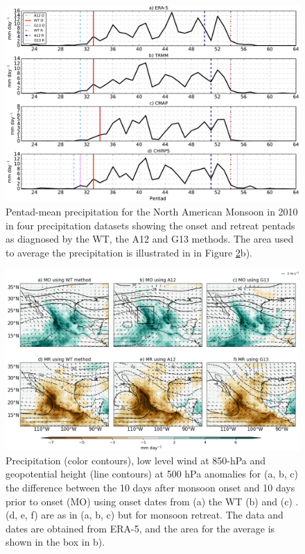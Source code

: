 \begin{figure}[t!]
\centering
 \includegraphics[width=\linewidth]{figures/wav_fig5.pdf}
\caption[Comparison of methods in 2010 in the North American Monsoon]{  Pentad-mean precipitation for the North American Monsoon in 2010 in four precipitation datasets showing the onset and retreat pentads as diagnosed by the WT, the A12 and G13 methods. The area used to average the precipitation is illustrated in in Figure \ref{fig:wav_fig6}b).} 
\label{fig:wav_compari}
\end{figure}


\begin{figure}[t!]
\centering
 \includegraphics[width=\linewidth]{figures/wav_fig6.png}
\caption[Precipitation anomalies during North American monsoon onset]{  Precipitation (color contours), low level wind at 850-hPa and geopotential height (line contours) at 500 hPa anomalies for (a, b, c) the difference between the 10 days after monsoon onset and 10 days prior to onset (MO) using onset dates from (a) the WT (b) \cite{arias2012} and (c) \cite{geil2013}. (d, e, f) are as in (a, b, c) but for monsoon retreat. The data and dates are obtained from ERA-5, and the area for the average is shown in the box in b). }
\label{fig:wav_fig6}
\end{figure}

